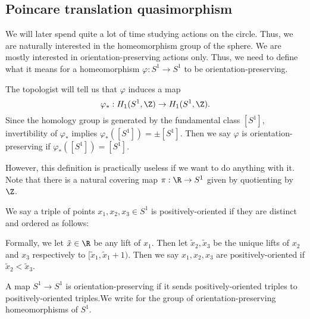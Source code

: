 \documentclass[a4paper]{article}
\newcommand\Homeo{\mathrm{Homeo}}
\begin{document}
\subsection{Poincare translation quasimorphism}
We will later spend quite a lot of time studying actions on the circle. Thus, we are naturally interested in the homeomorphism group of the sphere. We are mostly interested in orientation-preserving actions only. Thus, we need to define what it means for a homeomorphism $\varphi: S^1 \to S^1$ to be orientation-preserving.

The topologist will tell us that $\varphi$ induces a map
\[
  \varphi_*: H_1(S^1, \Z) \to H_1(S^1, \Z).
\]
Since the homology group is generated by the fundamental class $[S^1]$, invertibility of $\varphi_*$ implies $\varphi_*([S^1]) = \pm [S^1]$. Then we say $\varphi$ is orientation-preserving if $\varphi_*([S^1]) = [S^1]$.

However, this definition is practically useless if we want to do anything with it. Note that there is a natural covering map $\pi: \R \to S^1$ given by quotienting by $\Z$.

\begin{defi}
  We say a triple of points $x_1, x_2, x_3 \in S^1$ is positively-oriented if they are distinct and ordered as follows:
  \begin{center}
  \end{center}
  Formally, we let $\tilde{x} \in \R$ be any lift of $x_1$. Then let $\tilde{x}_2, \tilde{x}_3$ be the unique lifts of $x_2$ and $x_3$ respectively to $[\tilde{x}_1, \tilde{x}_1 + 1)$. Then we say $x_1, x_2, x_3$ are positively-oriented if $\tilde{x}_2 < \tilde{x}_3$.
\end{defi}

\begin{defi}
  A map $S^1 \to S^1$ is orientation-preserving if it sends positively-oriented triples to positively-oriented triples.We write \term{$\Homeo^+(S^1)$} for the group of orientation-preserving homeomorphisms of $S^1$.
\end{defi}
\end{document}
